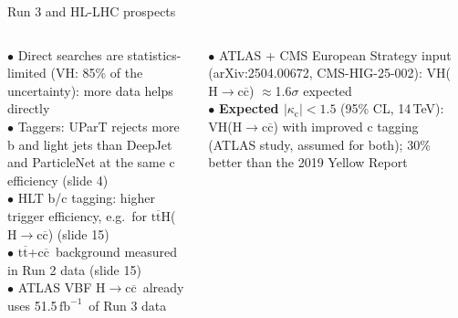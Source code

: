 \documentclass[aspectratio=169,10pt,xcolor=table]{beamer}
\newcommand{\qbar}[1]{\mathrm{#1}\overline{\mathrm{#1}}}
\newcommand{\ccbar}{\ensuremath{\qbar{c}}}
\newcommand{\kc}{\ensuremath{\kappa_\mathrm{c}}}
\newcommand{\Hcc}{\ensuremath{\mathrm{H}\to\qbar{c}}}
\newcommand{\ttH}{\ensuremath{\qbar{t}\mathrm{H}}}
\newcommand{\ttbar}{\ensuremath{\qbar{t}}}
\newcommand{\fbinv}{\ensuremath{\,\mathrm{fb}^{-1}}}
\newcommand{\up}{\vspace*{-0.8em}}
\begin{document}
\begin{frame}[t]{Run 3 and HL-LHC prospects}
  \up
  \begin{columns}[T]
    \par\vspace{2pt}
    {\footnotesize
    $\bullet$ Direct searches are statistics-limited (VH: 85\% of the uncertainty): more data helps directly\\
    $\bullet$ Taggers: UParT rejects more b and light jets than DeepJet and ParticleNet at the same c efficiency (slide 4)\\
    $\bullet$ HLT b/c tagging: higher trigger efficiency, e.g.\ for \ttH(\Hcc) (slide 15)\\
    $\bullet$ \ttbar+\ccbar\ background measured in Run 2 data (slide 15)\\
    $\bullet$ ATLAS VBF \Hcc\ already uses 51.5\fbinv\ of Run 3 data\par}
    \vspace{5pt}
    \par\vspace{2pt}
    {\footnotesize
    $\bullet$ ATLAS + CMS European Strategy input (arXiv:2504.00672, CMS-HIG-25-002): VH(\Hcc) $\approx$1.6$\sigma$ expected\\
    $\bullet$ \textbf{Expected $|\kc| < 1.5$} (95\% CL, 14\,TeV): VH(\Hcc) with improved c tagging (ATLAS study, assumed for both); 30\% better than the 2019 Yellow Report\par}


\end{columns}
\end{frame}
\end{document}
